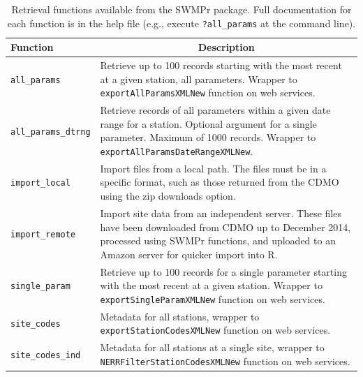 \documentclass[10pt,letterpaper]{article}\usepackage[]{graphicx}\usepackage[]{color}
\begin{document}
\begin{table}[!tbp]
\caption{Retrieval functions available from the SWMPr package. Full documentation for each function is in the help file (e.g., execute \texttt{?all\_params} at the command line).\label{tab:retrieve}} 
\begin{center}
\begin{tabular}{lp{3.5in}}
\hline\hline
\multicolumn{1}{l}{Function}&\multicolumn{1}{c}{Description}\tabularnewline
\hline
\texttt{all\_params}&Retrieve up to 100 records starting with the most recent at a given station, all parameters.  Wrapper to \texttt{exportAllParamsXMLNew} function on web services.\tabularnewline
\texttt{all\_params\_dtrng}&Retrieve records of all parameters within a given date range for a station.  Optional argument for a single parameter.  Maximum of 1000 records. Wrapper to \texttt{exportAllParamsDateRangeXMLNew}.\tabularnewline
\texttt{import\_local}&Import files from a local path.  The files must be in a specific format, such as those returned from the \ac{CDMO} using the zip downloads option.\tabularnewline
\texttt{import\_remote}&Import site data from an independent server. These files have been downloaded from \ac{CDMO} up to December 2014, processed using SWMPr functions, and uploaded to an Amazon server for quicker import into R.\tabularnewline
\texttt{single\_param}&Retrieve up to 100 records for a single parameter starting with the most recent at a given station.  Wrapper to \texttt{exportSingleParamXMLNew} function on web services.\tabularnewline
\texttt{site\_codes}&Metadata for all stations, wrapper to \texttt{exportStationCodesXMLNew} function on web services.\tabularnewline
\texttt{site\_codes\_ind}&Metadata for all stations at a single site, wrapper  to \texttt{NERRFilterStationCodesXMLNew} function on web services.\tabularnewline
\hline
\end{tabular}\end{center}

\end{table}
\end{document}
